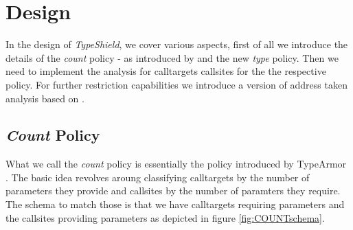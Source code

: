 \makeatletter
\providecommand{\bigsqcap}{%
  \mathop{%
    \mathpalette\@updown\bigsqcup
  }%
}
\newcommand*{\@updown}[2]{%
  \rotatebox[origin=c]{180}{$\m@th#1#2$}%
}
\makeatother

\makeatletter
\let\oldnl\nl%
\newcommand{\nonl}{\renewcommand{\nl}{\let\nl\oldnl}}%
\makeatother

\let\oldalgorithm\algorithm
\let\oldendalgorithm\endalgorithm

  \let\algorithm\figure
  \let\endalgorithm\endfigure

\chapter{Design}
\label{chapter:Design}

In the design of \textit{TypeShield}, we cover various aspects, first of all we introduce the details of the \emph{count} policy - as introduced by \cite{veen:typearmor} and the new \emph{type} policy. Then we need to implement the analysis for calltargets callsites for the the respective policy. For further restriction capabilities we introduce a version of address taken analysis based on \cite{mingwei:sekar}. 

\section{\emph{Count} Policy}
\label{section:countpolicy}

What we call the \emph{count} policy is essentially the policy introduced by TypeArmor \cite{veen:typearmor}. The basic idea revolves aroung classifying calltargets by the number of parameters they provide and callsites by the number of paramters they require. The schema to match those is that we have calltargets requiring parameters and the callsites providing parameters as depicted in figure \ref{fig:COUNTschema}.


